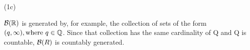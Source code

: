 (1c)

$\mathcal{B} (\mathbb{R})$ is generated by, for example, the collection of sets of the form $ (q, \infty), \text{where } q \in \mathbb{Q}$. Since that collection has the same cardinality of Q and Q is countable, $\mathcal{B} (R)$ is countably generated.